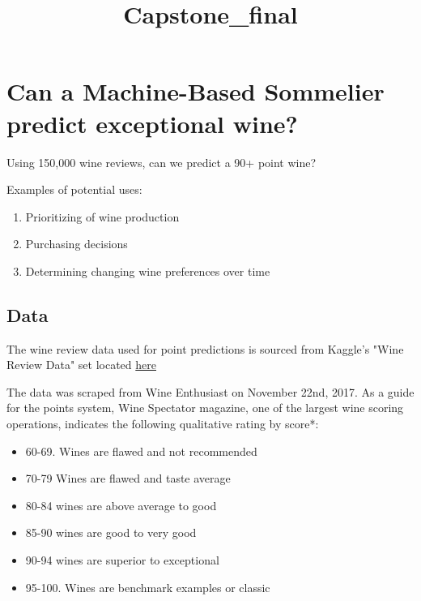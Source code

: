 \documentclass[11pt]{article}
\title{Capstone\_final}
\providecommand{\tightlist}{%
      \setlength{\itemsep}{0pt}\setlength{\parskip}{0pt}}
\begin{document}
    
    
    \maketitle
    
    

    
    \section{Can a Machine-Based Sommelier predict exceptional
wine?}\label{can-a-machine-based-sommelier-predict-exceptional-wine}

Using 150,000 wine reviews, can we predict a 90+ point wine?

Examples of potential uses:

\begin{enumerate}
\def\labelenumi{\arabic{enumi}.}
\tightlist
\item
  Prioritizing of wine production
\item
  Purchasing decisions
\item
  Determining changing wine preferences over time
\end{enumerate}

    \subsection{Data}\label{data}

The wine review data used for point predictions is sourced from Kaggle's
"Wine Review Data" set located
\href{https://www.kaggle.com/zynicide/wine-reviews/data}{here}

The data was scraped from Wine Enthusiast on November 22nd, 2017. As a
guide for the points system, Wine Spectator magazine, one of the largest
wine scoring operations, indicates the following qualitative rating by
score*:

\begin{itemize}
\tightlist
\item
  60-69. Wines are flawed and not recommended
\item
  70-79 Wines are flawed and taste average
\item
  80-84 wines are above average to good
\item
  85-90 wines are good to very good
\item
  90-94 wines are superior to exceptional
\item
  95-100. Wines are benchmark examples or classic
\end{itemize}
\end{document}
